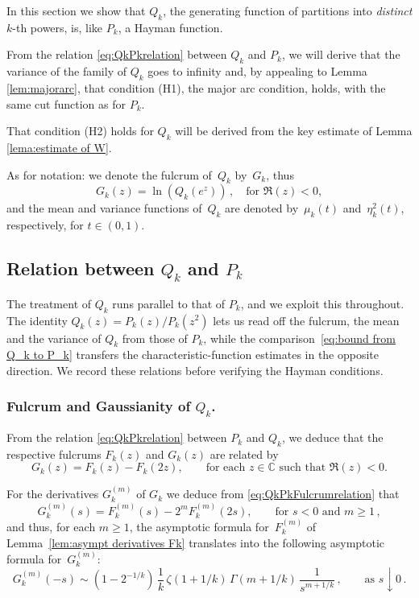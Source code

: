 \documentclass[12pt]{amsart}
\theoremstyle{definition}
\newcommand{\C}{\mathbb{C}}
\begin{document}
In this section we show  that $Q_k$, the generating function of partitions into \emph{distinct} $k$-th powers, is, like $P_k$, a Hayman function.

\medskip

From the relation \eqref{eq:QkPkrelation} between $Q_k$ and $P_k$, we will derive that the variance of the family of $Q_k$ goes to infinity and, by appealing to Lemma \ref{lem:majorarc},  that condition (H1), the major arc condition, holds, with the same cut function as for $P_k$.

That condition (H2) holds for $Q_k$ will be derived from the key estimate of Lemma \ref{lema:estimate of W}.

\medskip

As for notation: we denote the fulcrum of~$Q_k$ by~$G_k$, thus $$G_k(z)=\ln(Q_k(e^z))\,, \quad \mbox{for $\Re(z)<0$},$$ and the mean and variance functions of~$Q_k$ are denoted by~$\mu_k(t)$ and~$\eta_k^2(t)$, respectively, for $t \in (0,1)$.


\subsection{Relation between $Q_k$ and $P_k$}
The treatment of \(Q_k\) runs parallel to that of \(P_k\), and we exploit
this throughout. The identity $Q_k(z)={P_k(z)}/{P_k(z^2)}$
lets us read off the fulcrum, the mean and the variance of \(Q_k\) from
those of \(P_k\), while the comparison~\eqref{eq:bound from Q_k to P_k}
transfers the characteristic-function estimates in the opposite
direction. We record these relations before verifying the Hayman
conditions.

\subsubsection{Fulcrum and Gaussianity of $Q_k$.}


From the relation \eqref{eq:QkPkrelation} between $P_k$ and $Q_k$, we deduce that the respective fulcrums $F_k(z)$ and $G_k(z)$ are related by
\begin{equation}\label{eq:QkPkFulcrumrelation}
G_k(z) = F_k(z) - F_k(2z), \qquad \mbox{for each $z\in\C$ such that $\Re(z)<0$}.
\end{equation}

\smallskip

For the derivatives $G_k^{(m)}$ of $G_k$ we deduce from  \eqref{eq:QkPkFulcrumrelation} that
\begin{equation}\label{eq:QkPkFulcrumrelation derivatives}
G_k^{(m)}(s) = F_k^{(m)}(s) - 2^m F_k^{(m)}(2s), \qquad \text{for } s<0 \text{ and } m\ge 1\,,
\end{equation}
and thus, for each $m\ge 1$, the asymptotic formula for~$F_k^{(m)}$ of Lemma~\ref{lem:asympt derivatives Fk} translates into
the following asymptotic formula for~$G_k^{(m)}$:
\begin{equation}\label{eq:Gkasympt}
G_k^{(m)}(-s) \sim (1-2^{-1/k})\,\frac{1}{k}\,\zeta(1+1/k)\,\Gamma(m+1/k)\,\frac{1}{s^{m+1/k}}\,, \qquad \text{as } s\downarrow 0\,.
\end{equation}
\end{document}
